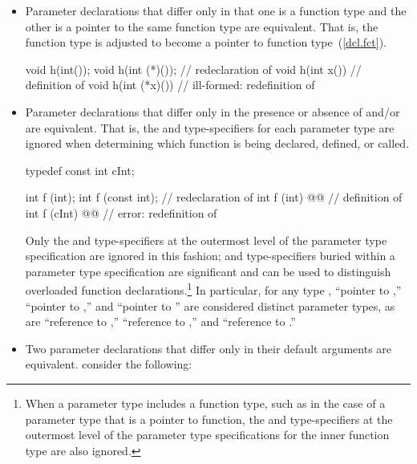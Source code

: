 \begin{itemize}
\item
Parameter declarations that differ only in that one is a function type
and the other is a pointer to the same function type are equivalent.
That is, the function type is adjusted to become a pointer to function type~(\ref{dcl.fct}).
\enterexample

\begin{codeblock}
void h(int());
void h(int (*)());              // redeclaration of 
void h(int x()) { }             // definition of 
void h(int (*x)()) { }          // ill-formed: redefinition of 
\end{codeblock}
\exitexample

\item
{}%
%
Parameter declarations that differ only in the presence or absence of
and/or
are equivalent.
That is, the
and
type-specifiers for
each parameter type are ignored when determining which function is being
declared,
defined, or called.
\enterexample

\begin{codeblock}
typedef const int cInt;

int f (int);
int f (const int);              // redeclaration of 
int f (int) @@      // definition of 
int f (cInt) @@     // error: redefinition of 
\end{codeblock}
\exitexample

Only the
and
type-specifiers at the outermost level of the
parameter type specification are ignored in this fashion;
and
type-specifiers buried within a parameter type specification are significant
and can be used to distinguish overloaded function
declarations.\footnote{When a parameter type includes a function type,
such as in the case of a parameter type that is a pointer to function, the
and
type-specifiers at the outermost level of the parameter type
specifications for the inner function type are also ignored.}
In particular, for any type
,
``pointer to
,''
``pointer to
,''
and
``pointer to
''
are considered distinct parameter types, as are
``reference to
,''
``reference to
,''
and
``reference to
.''
\item
{}%
Two parameter declarations that differ only in their default arguments
are equivalent.
\enterexample
consider the following:


\end{itemize}
